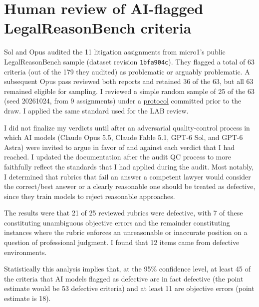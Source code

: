 \documentclass[11pt]{article}
\newcommand{\lrbAssignments}{11}
\newcommand{\lrbCriteria}{179}
\newcommand{\lrbFlagged}{63}
\newcommand{\lrbReconciled}{36}
\newcommand{\lrbSample}{25}
\newcommand{\lrbSampleAssignments}{9}
\newcommand{\lrbDefective}{21}
\newcommand{\lrbObjective}{7}
\newcommand{\lrbEnvItems}{12}
\newcommand{\lrbDefectiveLB}{45}
\newcommand{\lrbDefectivePoint}{53}
\newcommand{\lrbObjectiveLB}{11}
\newcommand{\lrbObjectivePoint}{18}
\begin{document}
\clearpage
\section{Human review of AI-flagged LegalReasonBench criteria}
\label{app:lrbreview}
Sol and Opus audited the \lrbAssignments{} litigation assignments from micro1's public LegalReasonBench sample (dataset revision \texttt{1bfa904c}). They flagged a total of \lrbFlagged{} criteria (out of the \lrbCriteria{} they audited) as problematic or arguably problematic. A subsequent Opus pass reviewed both reports and retained \lrbReconciled{} of the \lrbFlagged{}, but all \lrbFlagged{} remained eligible for sampling. I reviewed a simple random sample of \lrbSample{} of the \lrbFlagged{} (seed 20261024, from \lrbSampleAssignments{} assignments) under a \href{https://github.com/johnhughes3/LegalForecastBench/blob/main/docs/legalreasonbench-audit/litigation/human-review/README.md}{protocol} committed prior to the draw. I applied the same standard used for the LAB review.

I did not finalize my verdicts until after an adversarial quality-control process in which AI models (Claude Opus 5.5, Claude Fable 5.1, GPT-6 Sol, and GPT-6 Astra) were invited to argue in favor of and against each verdict that I had reached. I updated the documentation after the audit QC process to more faithfully reflect the standards that I had applied during the audit. Most notably, I determined that rubrics that fail an answer a competent lawyer would consider the correct/best answer or a clearly reasonable one should be treated as defective, since they train models to reject reasonable approaches.

The results were that \lrbDefective{} of \lrbSample{} reviewed rubrics were defective, with \lrbObjective{} of these constituting unambiguous objective errors and the remainder constituting instances where the rubric enforces an unreasonable or inaccurate position on a question of professional judgment. I found that \lrbEnvItems{} items came from defective environments.

Statistically this analysis implies that, at the 95\% confidence level, at least \lrbDefectiveLB{} of the criteria that AI models flagged as defective are in fact defective (the point estimate would be \lrbDefectivePoint{} defective criteria) and at least \lrbObjectiveLB{} are objective errors (point estimate is \lrbObjectivePoint{}).
\end{document}
